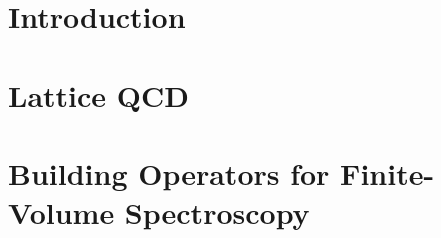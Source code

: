 \documentclass[12pt]{report}
\begin{document}
\onehalfspace



\tableofcontents

\chapter{Introduction}\label{ch:introduction}


\chapter{Lattice QCD}\label{ch:latticeqcd}


\chapter{Building Operators for Finite-Volume Spectroscopy}\label{ch:operators}

\end{document}
